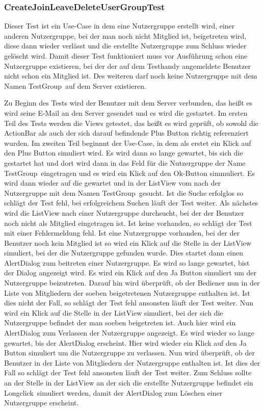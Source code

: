 \subsubsection{CreateJoinLeaveDeleteUserGroupTest}
Dieser Test ist ein Use-Case in dem eine Nutzergruppe erstellt wird, einer anderen Nutzergruppe, bei der man noch nicht Mitglied ist, beigetreten wird, diese dann wieder verlässt und die erstellte Nutzergruppe zum Schluss wieder gelöscht wird. Damit dieser Test funktioniert muss vor Ausführung schon eine Nutzergruppe existieren, bei der der auf dem Testhandy angemeldete Benutzer nicht schon ein Mitglied ist. Des weiteren darf noch keine Nutzergruppe mit dem Namen \glqq TestGroup\grqq\ auf dem Server existieren.

Zu Beginn des Tests wird der Benutzer mit dem Server verbunden, das heißt es wird seine E-Mail an den Server gesendet und es wird die  gestartet. Im ersten Teil des Tests werden die Views getestet, das heißt es wird geprüft, ob sowohl die ActionBar als auch der sich darauf befindende Plus Button richtig referenziert wurden. Im zweiten Teil beginnnt der Use-Case, in dem als erstet ein Klick auf den Plus Button simuliert wird. Es wird dann so lange gewartet, bis sich die  gestartet hat und dort wird dann in das Feld für die Nutzergruppe der Name \glqq TestGroup\grqq\ eingetragen und es wird ein Klick auf den \glqq Ok\grqq-Button simmuliert. Es wird dann wieder auf die  gewartet und in der ListView vom  nach der Nutzergruppe mit dem Namen \glqq TestGroup\grqq\ gesucht. Ist die Suche erfolglos so schlägt der Test fehl, bei erfolgreichem Suchen läuft der Test weiter. Als nächstes wird die ListView nach einer Nutzergruppe durchsucht, bei der der Benutzer noch nicht als Mitglied eingetragen ist. Ist keine vorhanden, so schlägt der Test mit einer Fehlermeldung fehl. Ist eine Nutzergruppe vorhanden, bei der der Benutzer noch kein Mitglied ist so wird ein Klick auf die Stelle in der ListView simuliert, bei der die Nutzergruppe gefunden wurde. Dies startet dann einen AlertDialog zum beitreten einer Nutzergruppe. Es wird so lange gewartet, bist der Dialog angezeigt wird. Es wird ein Klick auf den Ja Button simuliert um der Nutzergruppe beizutreten. Darauf hin wird überprüft, ob der Bediener nun in der Liste von Mitgliedern der soeben beigetretenen Nutzergruppe enthalten ist. Ist dies nicht der Fall, so schlägt der Test fehl ansonsten läuft der Test weiter. Nun wird ein Klick auf die Stelle in der ListView simuliert, bei der sich die Nutzergruppe befindet der man soeben beigetreten ist. Auch hier wird ein AlertDialog zum Verlassen der Nutzergruppe angezeigt. Es wird wieder so lange gewartet, bis der AlertDialog erscheint. Hier wird wieder ein Klick auf den Ja Button simuliert um die Nutzergruppe zu verlassen. Nun wird überprüft, ob der Benutzer in der Liste von Mitgliedern der Nutzergruppe enthalten ist. Ist dies der Fall so schlägt der Test fehl ansonsten läuft der Test weiter. Zum Schluss sollte an der Stelle in der ListView an der sich die erstellte Nutzergruppe befindet ein \glqq Longclick\grqq\ simuliert werden, damit der AlertDialog zum Löschen einer Nutzergruppe erscheint. 